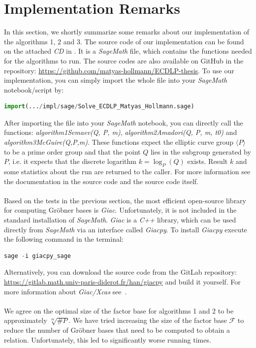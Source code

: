 \documentclass[thesis=M,english]{FITthesis}[2012/10/20]
\theoremstyle{remark}
\theoremstyle{definition}
\begin{document}
\section{Implementation Remarks}
In this section, we shortly summarize some remarks about our implementation of the algorithms 1, 2 and 3. The source code of our implementation can be found on the attached \textit{CD} in . It is a \textit{SageMath} file, which contains the functions needed for the algorithms to run. The source codes are also available on GitHub in the repository: \url{https://github.com/matyas-hollmann/ECDLP-thesis}. To use our implementation, you can simply import the whole file into your \textit{SageMath} notebook/script by:
\begin{lstlisting}[language=Python]
import(.../impl/sage/Solve_ECDLP_Matyas_Hollmann.sage)
\end{lstlisting}
After importing the file into your \textit{SageMath} notebook, you can directly call the functions: \textit{algorithm1Semaev(Q, P, m)}, \textit{algorithm2Amadori(Q, P, m, t0)} and \textit{algorithm3McGuire(Q,P,m)}.
These functions expect the elliptic curve group $\langle P \rangle$ to be a prime order group and that the point $Q$ lies in the subgroup generated by $P$, i.e. it expects that the discrete logarithm $k = \log_P(Q)$ exists. Result $k$ and some statistics about the run are returned to the caller. For more information see the documentation in the source code and the source code itself.
\\ \\
Based on the tests in the previous section, the most efficient open-source library for computing Gröbner bases is \textit{Giac}. Unfortunately, it is not included in the standard installation of \textit{SageMath}. \textit{Giac} is a \textit{C++} library, which can be used directly from \textit{SageMath} via an interface called \textit{Giacpy}. To install \textit{Giacpy} execute the following command in the terminal:
\begin{lstlisting}[language=Python]
sage -i giacpy_sage
\end{lstlisting}
Alternatively, you can download the source code from the GitLab repository: \url{https://gitlab.math.univ-paris-diderot.fr/han/giacpy} and build it yourself. For more information about \textit{Giac/Xcas} see~\cite{giac}.
\\ \\
\noindent We agree on the optimal size of the factor base for algorithms 1 and 2 to be approximately $\sqrt[m]{\#P}$. We have tried increasing the size of the factor base $\mathcal{F}$ to reduce the number of Gröbner bases that need to be computed to obtain a relation. Unfortunately, this led to significantly worse running times. \\ \\
\end{document}
